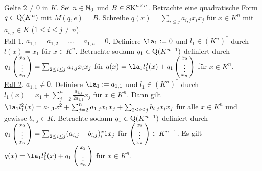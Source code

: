 \documentclass[../../main.tex]{subfiles}
\begin{document}
\begin{cproof}
Gelte $2\neq 0$ in $K$. Sei $n\in \mathbb N_0$ und $B\in \operatorname{SK}^{n\times n}$. Betrachte eine quadratische Form $q\in \operatorname{Q}(K^n)$ mit $M(q,e)=B$. Schreibe $q(x)=\sum_{i\le j} a_{i,j}x_ix_j$ für $x\in K^n$ mit $a_{i,j}\in K$ ($1\le i\le j\ne n$).\\
		
\noindent \underline{Fall 1}. $a_{1,1}=a_{1,2}=...=a_{1,n}=0$. Definiere $\la_1:=0$ und $l_1\in (K^n)^*$ durch $l(x)=x_1$ für $x\in K^n$. Betrachte sodann $q_1\in \operatorname{Q}(K^{n-1})$ definiert durch $q_1\left(\begin{smallmatrix}x_2\\\vdots\\x_n\end{smallmatrix}\right)=\sum_{2\le i\le j} a_{i,j}x_ix_j$ für $q(x)=\la_1l_1^2(x)+q_1\cvec{x_2\\\vdots\\x_n}$ für $x\in K^n$.\\
	
\noindent\underline{Fall 2}. $a_{1,1}\neq 0$. Definiere $\la_1:=a_{1,1}$ und $l_1\in (K^n)^*$ durch $l_1(x)=x_1+\sum_{j=2}^n\frac{a_{1,j}}{2a_{1,1}}x_j$ für $x\in K^n$. Dann gilt $\la_1l_1^2(x)=a_{1,1}x^2+\sum_{j=2}^n a_{1,j}x_1x_j+\sum_{2\le i\le j}b_{i,j}x_ix_j$ für alle $x\in K^n$ und gewisse $b_{i,j}\in K$. Betrachte sodann $q_1\in \operatorname{Q}(K^{n-1})$ definiert durch $q_1\left(\begin{smallmatrix}x_2\\\vdots\\x_n\end{smallmatrix}\right)=\sum_{2\le i\le j} (a_{i,j}-b_{i,j})^x_i1x_j$ für $\left(\begin{smallmatrix}x_2\\\vdots\\x_n\end{smallmatrix}\right)\in K^{n-1}$. Es gilt $q(x)=\la_1l_1^2(x)+q_1\cvec{x_2\\\vdots\\x_n}$ für $x\in K^n$.\\
	

\end{cproof}
\end{document}

